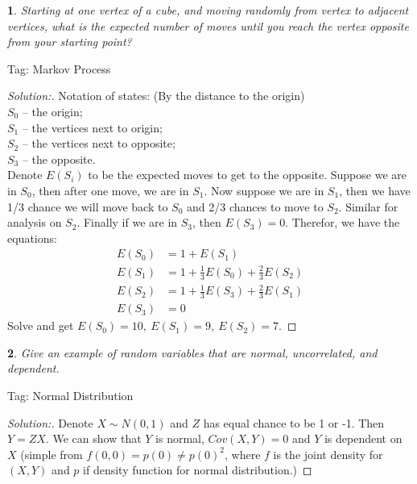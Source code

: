 \documentclass[10pt]{report}
\newtheorem{exe}{}[chapter]
\newenvironment{sol}{\begin{proof}[Solution:]}{\end{proof}}
\begin{document}
\begin{exe}
Starting at one vertex of a cube, and moving randomly from
vertex to adjacent vertices, what is the expected number of moves until you
reach the vertex opposite from your starting point?
\end{exe}
\begin{teacher}
Tag: Markov Process
\begin{sol}
Notation of states: (By the distance to the origin)\\
$S_0$ -- the origin;\\
$S_1$ -- the vertices next to origin;\\
$S_2$ -- the vertices next to opposite;\\
$S_3$ -- the opposite.\\
Denote $E(S_i)$ to be the expected moves to get to the opposite. Suppose we are in $S_0$, then after one move, we are in $S_1$. Now suppose we are in $S_1$, then we have 1/3 chance we will move back to $S_0$ and 2/3 chances to move to $S_2$. Similar for analysis on $S_2$. Finally if we are in $S_3$, then $E(S_3)=0$. Therefor, we have the equations:
\begin{align*}
E(S_0) &= 1+E(S_1)\\    
E(S_1) &= 1+\frac{1}{3}E(S_0)+\frac{2}{3}E(S_2)\\
E(S_2) &= 1+\frac{1}{3}E(S_3)+\frac{2}{3}E(S_1)\\
E(S_3) &= 0
\end{align*}
Solve and get $E(S_0)=10,\ E(S_1) =9,\ E(S_2) = 7$.
\end{sol}
\end{teacher}

\begin{exe}
Give an example of random variables that are normal, uncorrelated, and dependent.
\end{exe}
\begin{teacher}
Tag: Normal Distribution
\begin{sol}
Denote $X\sim N(0,1)$ and $Z$ has equal chance to be 1 or -1. Then $Y=ZX$. We can show that $Y$ is normal, $Cov(X, Y)=0$ and $Y$ is dependent on $X$ (simple from $f(0, 0) = p(0)\neq p(0)^2$, where $f$ is the joint density for $(X, Y)$ and $p$ if density function for normal distribution.)
\end{sol}
\end{teacher}
\end{document}
